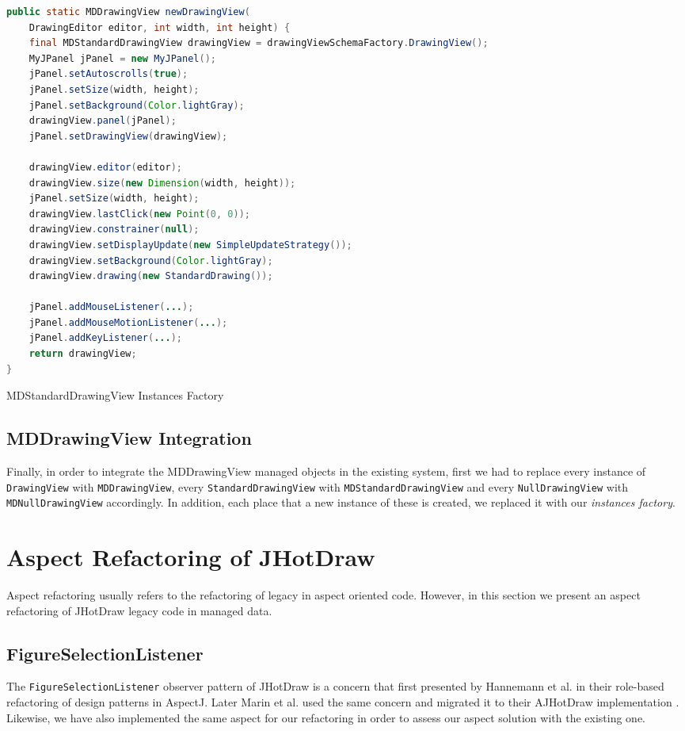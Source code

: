 \begin{sourcecode}[H]
	\begin{lstlisting}[language=Java, escapechar=|]
public static MDDrawingView newDrawingView(
	DrawingEditor editor, int width, int height) {
	final MDStandardDrawingView drawingView = drawingViewSchemaFactory.DrawingView();
	MyJPanel jPanel = new MyJPanel();
	jPanel.setAutoscrolls(true);
 	jPanel.setSize(width, height);
	jPanel.setBackground(Color.lightGray);
	drawingView.panel(jPanel);
	jPanel.setDrawingView(drawingView);

	drawingView.editor(editor);
	drawingView.size(new Dimension(width, height));
	jPanel.setSize(width, height);
	drawingView.lastClick(new Point(0, 0));
	drawingView.constrainer(null);
	drawingView.setDisplayUpdate(new SimpleUpdateStrategy());
	drawingView.setBackground(Color.lightGray);
	drawingView.drawing(new StandardDrawing());

	jPanel.addMouseListener(...);
	jPanel.addMouseMotionListener(...);
	jPanel.addKeyListener(...);
	return drawingView;
}
	\end{lstlisting}
	\label{lst:MDStandardDrawingView Instances Factory}
	\caption{MDStandardDrawingView Instances Factory}
\end{sourcecode}

\subsection{MDDrawingView Integration}
Finally, in order to integrate the MDDrawingView managed objects in the existing system, first we had to replace every instance of \texttt{DrawingView} with \texttt{MDDrawingView}, every \texttt{StandardDrawingView} with \texttt{MDStandardDrawingView} and every \texttt{NullDrawingView} with \texttt{MDNullDrawingView} accordingly.
In addition, each place that a new instance of these is created, we replaced it with our \textit{instances factory}.

\section{Aspect Refactoring of JHotDraw}
Aspect refactoring usually refers to the refactoring of legacy in aspect oriented code. 
However, in this section we present an aspect refactoring of JHotDraw legacy code in managed data.

\subsection{FigureSelectionListener}
The \texttt{FigureSelectionListener} observer pattern of JHotDraw is a concern that first presented by Hannemann et al. \cite{hannemann2005role} in their role-based refactoring of design patterns in AspectJ. 
Later Marin et al. used the same concern and migrated it to their AJHotDraw implementation \cite{marin2005approach}.
Likewise, we have also implemented the same aspect for our refactoring in order to assess our aspect solution with the existing one.

